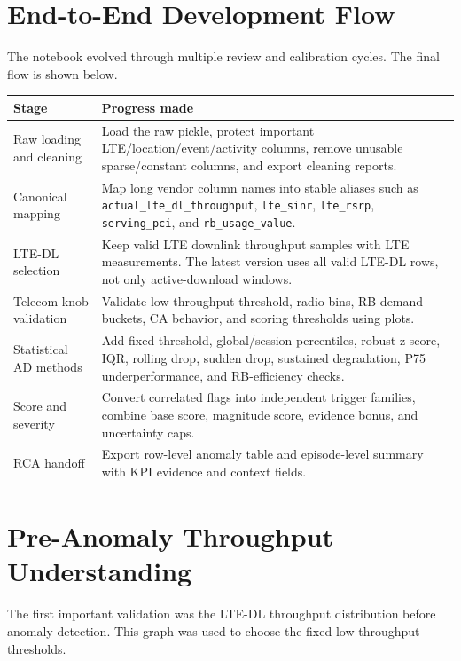 \documentclass[12pt,a4paper]{article}
\newcommand{\colname}[1]{\texttt{#1}}
\begin{document}
\section{End-to-End Development Flow}

The notebook evolved through multiple review and calibration cycles. The final flow is shown below.

\begin{center}
\begin{tabularx}{\textwidth}{L{0.25\textwidth}Y}
\toprule
\textbf{Stage} & \textbf{Progress made} \\
\midrule
Raw loading and cleaning & Load the raw pickle, protect important LTE/location/event/activity columns, remove unusable sparse/constant columns, and export cleaning reports. \\
Canonical mapping & Map long vendor column names into stable aliases such as \colname{actual\_lte\_dl\_throughput}, \colname{lte\_sinr}, \colname{lte\_rsrp}, \colname{serving\_pci}, and \colname{rb\_usage\_value}. \\
LTE-DL selection & Keep valid LTE downlink throughput samples with LTE measurements. The latest version uses all valid LTE-DL rows, not only active-download windows. \\
Telecom knob validation & Validate low-throughput threshold, radio bins, RB demand buckets, CA behavior, and scoring thresholds using plots. \\
Statistical AD methods & Add fixed threshold, global/session percentiles, robust z-score, IQR, rolling drop, sudden drop, sustained degradation, P75 underperformance, and RB-efficiency checks. \\
Score and severity & Convert correlated flags into independent trigger families, combine base score, magnitude score, evidence bonus, and uncertainty caps. \\
RCA handoff & Export row-level anomaly table and episode-level summary with KPI evidence and context fields. \\
\bottomrule
\end{tabularx}
\end{center}

\section{Pre-Anomaly Throughput Understanding}

The first important validation was the LTE-DL throughput distribution before anomaly detection. This graph was used to choose the fixed low-throughput thresholds.
\end{document}
